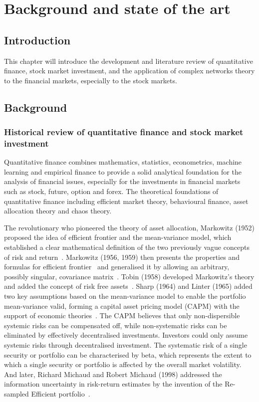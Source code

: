 \chapter[Background]{Background and state of the art}
\label{cpt:back}

\section{Introduction}
This chapter will introduce the development and literature review of quantitative finance, stock market investment, and the application of complex networks theory to the financial markets, especially to the stock markets.

\section{Background}
\subsection{Historical review of quantitative finance and stock market investment}
Quantitative finance combines mathematics, statistics, econometrics, machine learning and empirical finance to provide a solid analytical foundation for the analysis of financial issues, especially for the investments in financial markets such as stock, future, option and forex. The theoretical foundations of quantitative finance including efficient market theory, behavioural finance, asset allocation theory and chaos theory.

The revolutionary who pioneered the theory of asset allocation, Markowitz (1952) proposed the idea of efficient frontier and the mean-variance model, which established a clear mathematical definition of the two previously vague concepts of risk and return~\cite{portfolio}. Markowitz (1956, 1959) then presents the properties and formulas for efficient frontier~\cite{markowitz1956optimization} and generalised it by allowing an arbitrary, possibly singular, covariance matrix~\cite{markowitz1959portfolio}. Tobin (1958) developed Markowitz's theory and added the concept of risk free assets~\cite{tobin1958liquidity}. Sharp (1964) and Linter (1965) added two key assumptions based on the mean-variance model to enable the portfolio mean-variance valid, forming a capital asset pricing model (CAPM) with the support of economic theories~\cite{equilibrium, diversification}. The CAPM believes that only non-dispersible systemic risks can be compensated off, while non-systematic risks can be eliminated by effectively decentralised investments. Investors could only assume systemic risks through decentralised investment. The systematic risk of a single security or portfolio can be characterised by beta, which represents the extent to which a single security or portfolio is affected by the overall market volatility. And later, Richard Michaud and Robert Michaud (1998) addressed the information uncertainty in risk-return estimates by the invention of the Re-sampled Efficient portfolio~\cite{michaud1998asset}.


